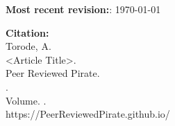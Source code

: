 	\textbf{Most recent revision:}: \today
	
	\vfill
	
	\textbf{Citation:} \\
	\hspace*{2em} Torode, A.\\
	\hspace*{2em} <Article Title>. \\
	\hspace*{2em} Peer Reviewed Pirate. \\
	\hspace*{2em} \DateToUse. \\
	\hspace*{2em} Volume. \Version. \\
	\hspace*{2em} https://PeerReviewedPirate.github.io/
	
	\endgroup
	\clearpage
\twocolumn